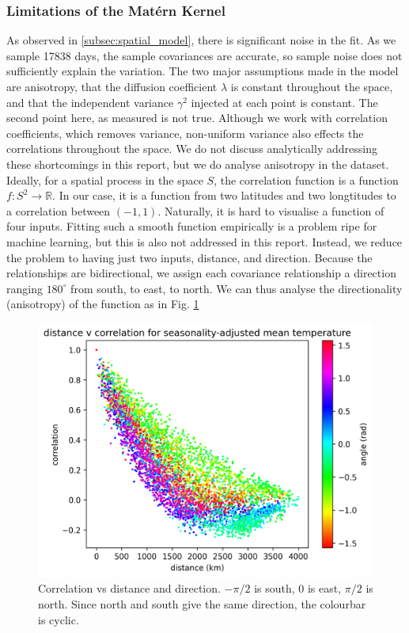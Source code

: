 \documentclass[12pt,a4paper]{article} %
\begin{document}
\subsubsection{Limitations of the Mat\'{e}rn Kernel}
As observed in \ref{subsec:spatial_model}, there is significant noise in the fit. As we sample 17838 days, the sample covariances are accurate, so sample noise does not sufficiently explain the variation. The two major assumptions made in the model are anisotropy, that the diffusion coefficient $\lambda$ is constant throughout the space, and that the independent variance $\gamma^2$ injected at each point is constant. The second point here, as measured is not true. Although we work with correlation coefficients, which removes variance, non-uniform variance also effects the correlations throughout the space. We do not discuss analytically addressing these shortcomings in this report, but we do analyse anisotropy in the dataset.\\
Ideally, for a spatial process in the space $S$, the correlation function is a function $f:S^2\to\mathbb{R}$. In our case, it is a function from two latitudes and two longtitudes to a correlation between $(-1,1)$. Naturally, it is hard to visualise a function of four inputs. Fitting such a smooth function empirically is a problem ripe for machine learning, but this is also not addressed in this report. Instead, we reduce the problem to having just two inputs, distance, and direction. Because the relationships are bidirectional, we assign each covariance relationship a direction ranging $180^\circ$ from south, to east, to north. We can thus analyse the directionality (anisotropy) of the function as in Fig. \ref{fig:anisotropy_1}
\begin{figure}[!ht]
    \centering
    \includegraphics[width=.8\linewidth]{mean_error_corr_by_dist_angle.png}
    \caption{Correlation vs distance and direction. $-\pi/2$ is south, $0$ is east, $\pi/2$ is north. Since north and south give the same direction, the colourbar is cyclic.}
    \label{fig:anisotropy_1}
\end{figure}
\end{document}

